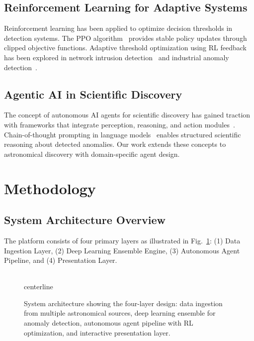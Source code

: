 \documentclass[conference]{IEEEtran}
\begin{document}
\subsection{Reinforcement Learning for Adaptive Systems}

Reinforcement learning has been applied to optimize decision thresholds in detection systems. The PPO algorithm~\cite{schulman2017proximal} provides stable policy updates through clipped objective functions. Adaptive threshold optimization using RL feedback has been explored in network intrusion detection~\cite{lopez2020application} and industrial anomaly detection~\cite{wang2021reinforcement}.

\subsection{Agentic AI in Scientific Discovery}

The concept of autonomous AI agents for scientific discovery has gained traction with frameworks that integrate perception, reasoning, and action modules~\cite{wang2024scientific}. Chain-of-thought prompting in language models~\cite{wei2022chain} enables structured scientific reasoning about detected anomalies. Our work extends these concepts to astronomical discovery with domain-specific agent design.

\section{Methodology}
\label{sec:methodology}

\subsection{System Architecture Overview}

The platform consists of four primary layers as illustrated in Fig.~\ref{fig:architecture}: (1) Data Ingestion Layer, (2) Deep Learning Ensemble Engine, (3) Autonomous Agent Pipeline, and (4) Presentation Layer.

\begin{figure}[htbp]
\\centerline{
}
\caption{System architecture showing the four-layer design: data ingestion from multiple astronomical sources, deep learning ensemble for anomaly detection, autonomous agent pipeline with RL optimization, and interactive presentation layer.}
\label{fig:architecture}
\end{figure}
\end{document}
